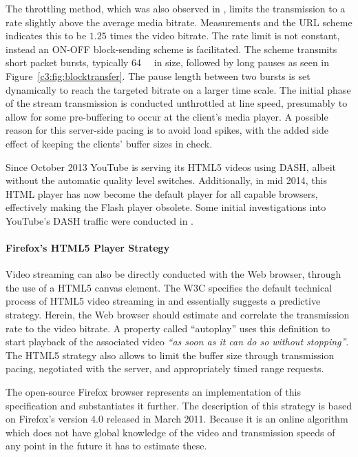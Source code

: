The throttling method, which was also observed in \cite{alcock2011afcyt}, limits the transmission to a rate slightly above the average media bitrate. Measurements and the \gls{URL} scheme indicates this to be $1.25$ times the video bitrate. The rate limit is not constant, instead an ON-OFF block-sending scheme is facilitated. The scheme transmits short packet bursts, typically \SI{64}{\kibi\byte} in size, followed by long pauses as seen in Figure~\ref{c3:fig:blocktransfer}. The pause length between two bursts is set dynamically to reach the targeted bitrate on a larger time scale. The initial phase of the stream transmission is conducted unthrottled at line speed, presumably to allow for some pre-buffering to occur at the client's media player. A possible reason for this server-side pacing is to avoid load spikes, with the added side effect of keeping the clients' buffer sizes in check.

Since October 2013 YouTube is serving its \acrshort{HTML}5 videos using \gls{DASH}, albeit without the automatic quality level switches. Additionally, in mid 2014, this \acrshort{HTML} player has now become the default player for all capable browsers, effectively making the Flash player obsolete. Some initial investigations into YouTube's \gls{DASH} traffic were conducted in \cite{2014arXiv1408.5777A}.


\paragraph{Firefox's HTML5 Player Strategy}

Video streaming can also be directly conducted with the Web browser, through the use of a \acrshort{HTML}5 canvas element. The \gls{W3C} specifies the default technical process of \acrshort{HTML}5 video streaming in \cite{html5video} and essentially suggests a predictive strategy. Herein, the Web browser should estimate and correlate the transmission rate to the video bitrate. A property called ``autoplay'' uses this definition to start playback of the associated video \textit{\enquote{as soon as it can do so without stopping}}. The \acrshort{HTML}5 strategy also allows to limit the buffer size through transmission pacing, negotiated with the server, and appropriately timed range requests.

The open-source Firefox browser represents an implementation of this specification and substantiates it further. The description of this strategy is based on Firefox's version 4.0 released in March 2011. Because it is an online algorithm which does not have global knowledge of the video and transmission speeds of any point in the future it has to estimate these.


